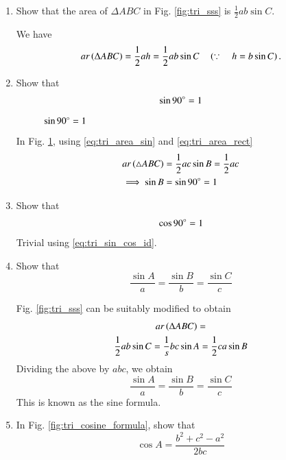 \renewcommand{\theequation}{\theenumi}
\begin{enumerate}[label=\arabic*.,ref=\thesubsection.\theenumi]

\item
\label{prob:tri_area_sin}
	Show that the area of $\Delta ABC$ in Fig. 	\ref{fig:tri_sss}	is $\frac{1}{2}ab \sin C$.

\solution We have
%
\begin{equation}
ar\left(\Delta ABC\right) = \frac{1}{2}ah = \frac{1}{2}ab\sin C \quad \left(\because \quad h = b \sin C\right).
\label{eq:tri_area_sin}
\end{equation}
%
\item Show that
\begin{align}
\label{eq:sin90}
\sin 90 \degree = 1
\end{align}
%
\begin{figure}[!ht]
\centering
\resizebox{\columnwidth}{!}{}
\caption{$\sin 90\degree = 1$}
\label{fig:tri_right_angle_area}	
\end{figure}

\solution In Fig. \ref{fig:tri_right_angle_area}, 
using \eqref{eq:tri_area_sin} and \eqref{eq:tri_area_rect}
\begin{align}
ar \left(\triangle ABC\right) &= \frac{1}{2}ac \sin B = \frac{1}{2}ac
\\
\implies \sin B &= \sin 90\degree = 1
\end{align}
%
\item Show that
\begin{align}
\label{eq:cos90}
\cos 90 \degree = 1
\end{align}
%
\solution Trivial using \eqref{eq:tri_sin_cos_id}.


\item
	Show that 
	\begin{equation}
	\frac{\sin A}{a} = \frac{\sin B}{b} = \frac{\sin C}{c}
	\end{equation}

\solution Fig. \ref{fig:tri_sss} can be suitably modified to obtain 
\begin{multline}
ar\left(\Delta ABC\right) = 
\\
\frac{1}{2}ab\sin C = \frac{1}{s}bc\sin A = \frac{1}{2}ca\sin B
\end{multline}
Dividing the above by $abc$, we obtain
	\begin{equation}
\label{eq:tri_sin_form}
	\frac{\sin A}{a} = \frac{\sin B}{b} = \frac{\sin C}{c}
	\end{equation}
This is known as the sine formula.	
%
\item
In Fig. \ref{fig:tri_cosine_formula}, show that
%
\begin{equation}
\label{eq:tri_cos_form}
\cos A = \frac{b^2+c^2-a^2}{2bc}
\end{equation}
%
\


\end{enumerate}
